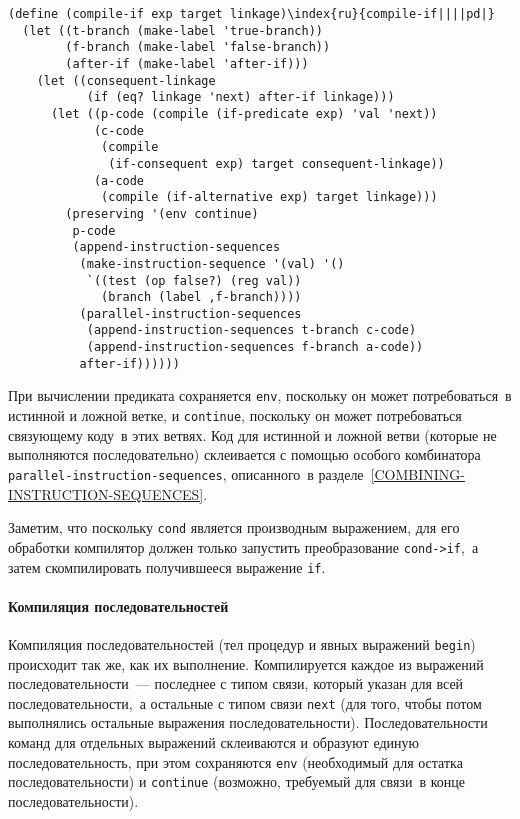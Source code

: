 \begin{Verbatim}[fontsize=\small]
(define (compile-if exp target linkage)\index{ru}{compile-if||||pd|}
  (let ((t-branch (make-label 'true-branch))
        (f-branch (make-label 'false-branch))                    
        (after-if (make-label 'after-if)))
    (let ((consequent-linkage
           (if (eq? linkage 'next) after-if linkage)))
      (let ((p-code (compile (if-predicate exp) 'val 'next))
            (c-code
             (compile
              (if-consequent exp) target consequent-linkage))
            (a-code
             (compile (if-alternative exp) target linkage)))
        (preserving '(env continue)
         p-code
         (append-instruction-sequences
          (make-instruction-sequence '(val) '()
           `((test (op false?) (reg val))
             (branch (label ,f-branch))))
          (parallel-instruction-sequences
           (append-instruction-sequences t-branch c-code)
           (append-instruction-sequences f-branch a-code))
          after-if))))))
\end{Verbatim}
При вычислении предиката сохраняется {\tt env}, поскольку он
может потребоваться~в истинной и ложной ветке, и
{\tt continue}, поскольку он может потребоваться связующему
коду~в этих ветвях.  Код для истинной и ложной ветви (которые не
выполняются последовательно) склеивается с помощью особого комбинатора
{\tt parallel-instruction-sequences}, описанного~в 
разделе~\ref{COMBINING-INSTRUCTION-SEQUENCES}.

Заметим, что поскольку {\tt cond} является
производным выражением, для его обработки компилятор должен только
запустить преобразование {\tt cond->if},~а затем
скомпилировать получившееся выражение {\tt if}.

\paragraph{Компиляция последовательностей}

Компиляция последовательностей (тел процедур и явных
выражений {\tt be\-gin}) происходит так же, как их выполнение.
Компилируется каждое из выражений последовательности~--- последнее с
типом связи, который указан для всей последовательности,~а остальные с
типом связи {\tt next} (для того, чтобы потом выполнялись
остальные выражения последовательности).  Последовательности команд
для отдельных выражений склеиваются и образуют единую
последовательность, при этом сохраняются {\tt env}
(необходимый для остатка последовательности) и {\tt continue}
(возможно, требуемый для связи~в конце последовательности).


